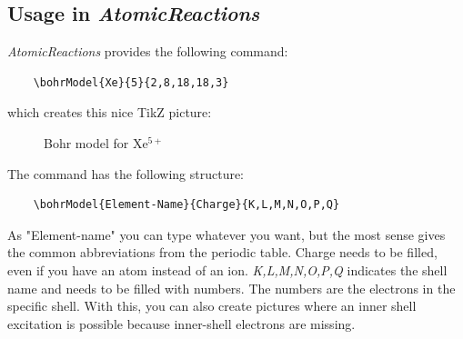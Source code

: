 \documentclass[
	a4paper,
	parskip=half,
    pagesize=auto,      		%
    listof=totoc,   		%
    bibliography=totoc,
	11pt
]{scrartcl}
\begin{document}
\subsection{Usage in \textit{AtomicReactions}} \label{ch:bohr}
 
\textit{AtomicReactions} provides the following command:
 
 \begin{lstlisting}
 	\bohrModel{Xe}{5}{2,8,18,18,3}
 \end{lstlisting}
 
 which creates this nice TikZ picture:
 
 
 \begin{figure}[htp]
 	\centering
 	\caption[Bohr model for Xe$^{5+}$]{Bohr model for Xe$^{5+}$}
 	\label{pic:prozess:EA-single}
 \end{figure}

The command has the following structure: 

 \begin{lstlisting}
	\bohrModel{Element-Name}{Charge}{K,L,M,N,O,P,Q}
\end{lstlisting}

As "Element-name" you can type whatever you want, but the most sense gives the common abbreviations from the periodic table. 
Charge needs to be filled, even if you have an atom instead of an ion. 
\textit{K,L,M,N,O,P,Q} indicates the shell name and needs to be filled with numbers. The numbers are the electrons in the specific shell. With this, you can also create pictures where an inner shell excitation is possible because inner-shell electrons are missing. 
\end{document}
